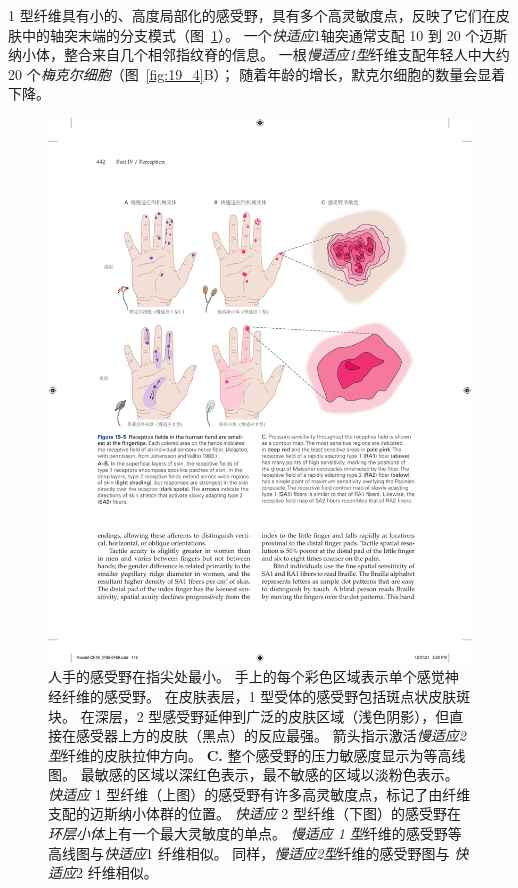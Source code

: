 1 型纤维具有小的、高度局部化的感受野，具有多个高灵敏度点，反映了它们在皮肤中的轴突末端的分支模式（图~\ref{fig:19_5}）。
一个\textit{快适应}1轴突通常支配 10 到 20 个迈斯纳小体，整合来自几个相邻指纹脊的信息。
一根\textit{慢适应1型}纤维支配年轻人中大约 20 个\textit{梅克尔细胞}（图~\ref{fig:19_4}B）；
随着年龄的增长，默克尔细胞的数量会显着下降。


\begin{figure}[htbp]
	\centering
	\includegraphics[width=1.0\linewidth]{chap19/fig_19_5}
	\caption{人手的感受野在指尖处最小。
		手上的每个彩色区域表示单个感觉神经纤维的感受野\cite{johansson1983tactile}。
		在皮肤表层，1 型受体的感受野包括斑点状皮肤斑块。
		在深层，2 型感受野延伸到广泛的皮肤区域（浅色阴影），但直接在感受器上方的皮肤（黑点）的反应最强。 
		箭头指示激活\textit{慢适应2型}纤维的皮肤拉伸方向。
		\textbf{C.} 整个感受野的压力敏感度显示为等高线图。
		最敏感的区域以深红色表示，最不敏感的区域以淡粉色表示。
		\textit{快适应} 1 型纤维（上图）的感受野有许多高灵敏度点，标记了由纤维支配的迈斯纳小体群的位置。
		\textit{快适应} 2 型纤维（下图）的感受野在\textit{环层小体}上有一个最大灵敏度的单点。
		\textit{慢适应 1 型}纤维的感受野等高线图与\textit{快适应}1 纤维相似。
		同样，\textit{慢适应2型}纤维的感受野图与 \textit{快适应}2 纤维相似。}
	\label{fig:19_5}
\end{figure}


